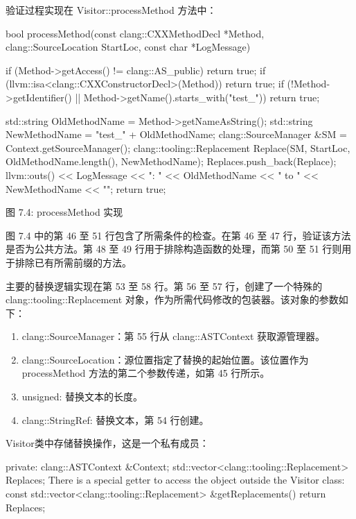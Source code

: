 验证过程实现在 Visitor::processMethod 方法中：

\begin{cpp}
bool processMethod(const clang::CXXMethodDecl *Method,
                   clang::SourceLocation StartLoc, const char *LogMessage) {
  if (Method->getAccess() != clang::AS_public)
    return true;
  if (llvm::isa<clang::CXXConstructorDecl>(Method))
    return true;
  if (!Method->getIdentifier() || Method->getName().starts_with("test_"))
    return true;

  std::string OldMethodName = Method->getNameAsString();
  std::string NewMethodName = "test_" + OldMethodName;
  clang::SourceManager &SM = Context.getSourceManager();
  clang::tooling::Replacement Replace(SM, StartLoc, OldMethodName.length(),
                                      NewMethodName);
  Replaces.push_back(Replace);
  llvm::outs() << LogMessage << ": " << OldMethodName << " to "
               << NewMethodName << "\n";
  return true;
}
\end{cpp}

\begin{center}
图 7.4: processMethod 实现
\end{center}

图 7.4 中的第 46 至 51 行包含了所需条件的检查。在第 46 至 47 行，验证该方法是否为公共方法。第 48 至 49 行用于排除构造函数的处理，而第 50 至 51 行则用于排除已有所需前缀的方法。

主要的替换逻辑实现在第 53 至 58 行。第 56 至 57 行，创建了一个特殊的 clang::tooling::Replacement 对象，作为所需代码修改的包装器。该对象的参数如下：

\begin{enumerate}
\item
clang::SourceManager：第 55 行从 clang::ASTContext 获取源管理器。

\item
clang::SourceLocation：源位置指定了替换的起始位置。该位置作为 processMethod 方法的第二个参数传递，如第 45 行所示。

\item
unsigned: 替换文本的长度。

\item
clang::StringRef: 替换文本，第 54 行创建。
\end{enumerate}

Visitor类中存储替换操作，这是一个私有成员：

\begin{cpp}
private:
  clang::ASTContext &Context;
  std::vector<clang::tooling::Replacement> Replaces;
There is a special getter to access the object outside the Visitor class:
  const std::vector<clang::tooling::Replacement> &getReplacements() {
  return Replaces;
}
\end{cpp}

